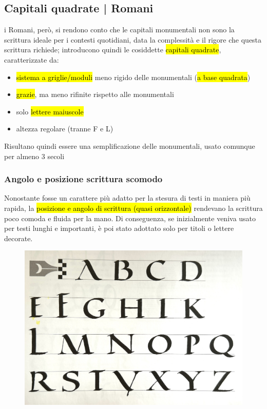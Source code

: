 \subsection{Capitali quadrate | Romani}
i Romani, però, si rendono conto che le capitali monumentali non sono la scrittura ideale per i contesti quotidiani, data la complessità e il rigore che questa scrittura richiede; introducono quindi le cosiddette \hl{capitali quadrate}, caratterizzate da:
\begin{itemize}
    \item \hl{sistema a griglie/moduli} meno rigido delle monumentali (\hl{a base quadrata})
    \item \hl{grazie}, ma meno rifinite rispetto alle monumentali
    \item solo \hl{lettere maiuscole}
    \item altezza regolare (tranne F e L)
\end{itemize}
Risultano quindi essere una semplificazione delle monumentali, usato comunque per almeno 3 secoli
\subsubsection{Angolo e posizione scrittura scomodo}
Nonostante fosse un carattere più adatto per la stesura di testi in maniera più rapida, la \hl{posizione e angolo di scrittura (quasi orizzontale) } rendevano la scrittura poco comoda e fluida per la mano. Di conseguenza, se inizialmente veniva usato per testi lunghi e importanti, è poi stato adottato solo per titoli o lettere decorate.
\begin{figure}[H]
    \centering
    \includegraphics[width=0.3\linewidth]{blocco_3 - storia della scrittura/imgs/cap_quadrata.jpg}
\end{figure}
